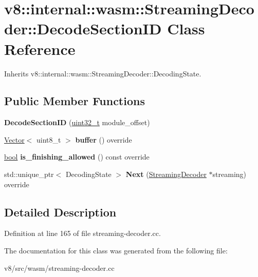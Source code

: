 \hypertarget{classv8_1_1internal_1_1wasm_1_1StreamingDecoder_1_1DecodeSectionID}{}\section{v8\+:\+:internal\+:\+:wasm\+:\+:Streaming\+Decoder\+:\+:Decode\+Section\+ID Class Reference}
\label{classv8_1_1internal_1_1wasm_1_1StreamingDecoder_1_1DecodeSectionID}


Inherits v8\+::internal\+::wasm\+::\+Streaming\+Decoder\+::\+Decoding\+State.

\subsection*{Public Member Functions}
\begin{DoxyCompactItemize}
\item 
\mbox{\label{classv8_1_1internal_1_1wasm_1_1StreamingDecoder_1_1DecodeSectionID_acfb2bac0a68f770bbd87dbf7b9822112}} 
{\bfseries Decode\+Section\+ID} (\mbox{\hyperlink{classuint32__t}{uint32\+\_\+t}} module\+\_\+offset)
\item 
\mbox{\label{classv8_1_1internal_1_1wasm_1_1StreamingDecoder_1_1DecodeSectionID_a65d2e84e2929733a8fde05b6d3e759dd}} 
\mbox{\hyperlink{classv8_1_1internal_1_1Vector}{Vector}}$<$ uint8\+\_\+t $>$ {\bfseries buffer} () override
\item 
\mbox{\label{classv8_1_1internal_1_1wasm_1_1StreamingDecoder_1_1DecodeSectionID_af37985d050ae145f28dbe223faab96a6}} 
\mbox{\hyperlink{classbool}{bool}} {\bfseries is\+\_\+finishing\+\_\+allowed} () const override
\item 
\mbox{\label{classv8_1_1internal_1_1wasm_1_1StreamingDecoder_1_1DecodeSectionID_a0ca008e4accae3370e441e0ff57a2cc3}} 
std\+::unique\+\_\+ptr$<$ Decoding\+State $>$ {\bfseries Next} (\mbox{\hyperlink{classv8_1_1internal_1_1wasm_1_1StreamingDecoder}{Streaming\+Decoder}} $\ast$streaming) override
\end{DoxyCompactItemize}


\subsection{Detailed Description}


Definition at line 165 of file streaming-\/decoder.\+cc.



The documentation for this class was generated from the following file\+:\begin{DoxyCompactItemize}
\item 
v8/src/wasm/streaming-\/decoder.\+cc\end{DoxyCompactItemize}
